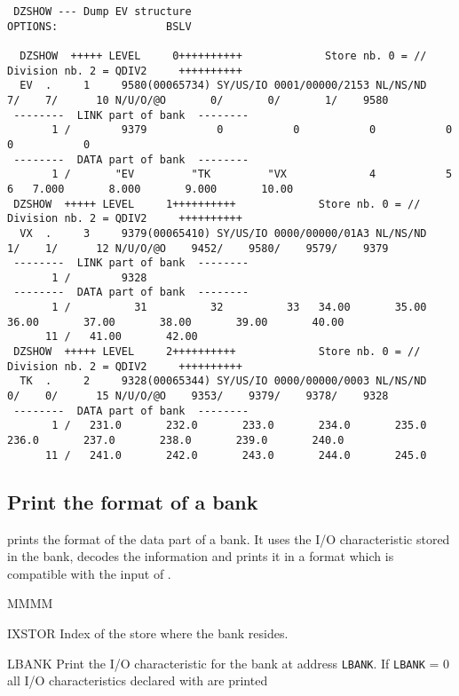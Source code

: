\begin{Listing}\begin{verbatim}
 DZSHOW --- Dump EV structure                                                                      OPTIONS:                 BSLV
 
  DZSHOW  +++++ LEVEL     0++++++++++             Store nb. 0 = //       Division nb. 2 = QDIV2     ++++++++++
  EV  .     1     9580(00065734) SY/US/IO 0001/00000/2153 NL/NS/ND    7/    7/      10 N/U/O/@O       0/       0/       1/    9580
 --------  LINK part of bank  --------
       1 /        9379           0           0           0           0           0           0
 --------  DATA part of bank  --------
       1 /       "EV         "TK         "VX             4           5           6   7.000       8.000       9.000       10.00
 DZSHOW  +++++ LEVEL     1++++++++++             Store nb. 0 = //       Division nb. 2 = QDIV2     ++++++++++
  VX  .     3     9379(00065410) SY/US/IO 0000/00000/01A3 NL/NS/ND    1/    1/      12 N/U/O/@O    9452/    9580/    9579/    9379
 --------  LINK part of bank  --------
       1 /        9328
 --------  DATA part of bank  --------
       1 /          31          32          33   34.00       35.00       36.00       37.00       38.00       39.00       40.00
      11 /   41.00       42.00
 DZSHOW  +++++ LEVEL     2++++++++++             Store nb. 0 = //       Division nb. 2 = QDIV2     ++++++++++
  TK  .     2     9328(00065344) SY/US/IO 0000/00000/0003 NL/NS/ND    0/    0/      15 N/U/O/@O    9353/    9379/    9378/    9328
 --------  DATA part of bank  --------
       1 /   231.0       232.0       233.0       234.0       235.0       236.0       237.0       238.0       239.0       240.0
      11 /   241.0       242.0       243.0       244.0       245.0
\end{verbatim}\end{Listing}
\subsection{Print the format of a bank}
\par {} prints the format of the data part of a bank.
It uses the I/O characteristic stored in the bank, decodes the
information and prints it in a format which is compatible with the
input of .
\Idesc
\begin{DL}{MMMM}
\item[IXSTOR]Index of the store where the bank resides.
\item[LBANK]Print the I/O characteristic for the bank at address {\tt LBANK}.
\newline If {\tt LBANK} = 0 all I/O characteristics declared with
 are printed
\end{DL}
